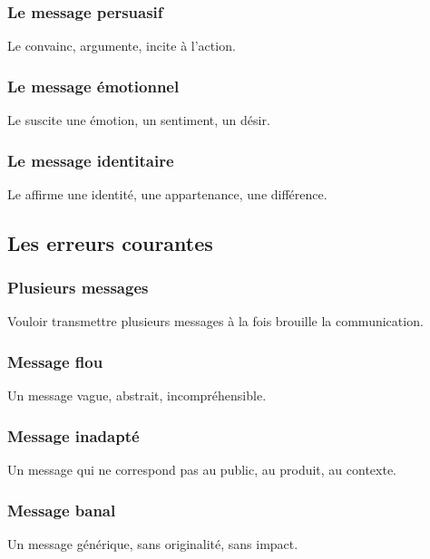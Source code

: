 \subsubsection{Le message persuasif}

Le  convainc, argumente, incite à l'action.

\subsubsection{Le message émotionnel}

Le  suscite une émotion, un sentiment, un désir.

\subsubsection{Le message identitaire}

Le  affirme une identité, une appartenance, une différence.

\subsection{Les erreurs courantes}

\subsubsection{Plusieurs messages}

Vouloir transmettre plusieurs messages à la fois brouille la communication.

\subsubsection{Message flou}

Un message vague, abstrait, incompréhensible.

\subsubsection{Message inadapté}

Un message qui ne correspond pas au public, au produit, au contexte.

\subsubsection{Message banal}

Un message générique, sans originalité, sans impact.

